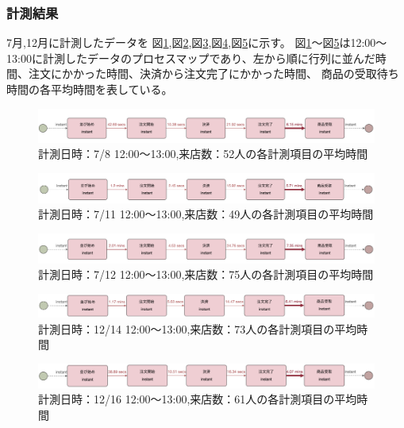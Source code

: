\documentclass{jsarticle}
\begin{document}
\subsubsection{計測結果}

7月,12月に計測したデータを
図\ref{fig:708},図\ref{fig:711},図\ref{fig:712},図\ref{fig:1214},図\ref{fig:1216}に示す。
図\ref{fig:708}〜図\ref{fig:1216}は12:00〜13:00に計測したデータのプロセスマップであり、左から順に行列に並んだ時間、注文にかかった時間、決済から注文完了にかかった時間、
商品の受取待ち時間の各平均時間を表している。

\begin{figure}[H]
  \centering
  \includegraphics[width=15cm]{708.png}
  \caption{計測日時：7/8 12:00〜13:00,来店数：52人の各計測項目の平均時間}
  \label{fig:708}
\end{figure}

\begin{figure}[H]
  \centering
  \includegraphics[width=15cm]{711.png}
  \caption{計測日時：7/11 12:00〜13:00,来店数：49人の各計測項目の平均時間}
  \label{fig:711}
\end{figure}

\begin{figure}[H]
  \centering
  \includegraphics[width=15cm]{712.png}
  \caption{計測日時：7/12 12:00〜13:00,来店数：75人の各計測項目の平均時間}
  \label{fig:712}
\end{figure}

\begin{figure}[H]
  \centering
  \includegraphics[width=15cm]{1214.png}
  \caption{計測日時：12/14 12:00〜13:00,来店数：73人の各計測項目の平均時間}
  \label{fig:1214}
\end{figure}

\begin{figure}[H]
  \centering
  \includegraphics[width=15cm]{1216.png}
  \caption{計測日時：12/16 12:00〜13:00,来店数：61人の各計測項目の平均時間}
  \label{fig:1216}
\end{figure}
\end{document}
